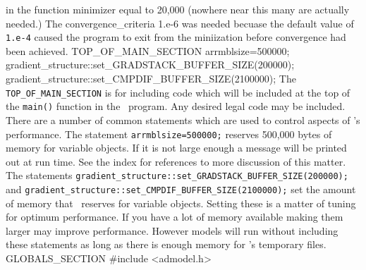 \documentclass[12pt]{book}
\begin{document}
in the function minimizer equal to 20,000 (nowhere near this many are actually
needed.) 
The   convergence\_criteria 1.e-6 
was needed becuase the default value of {\tt 1.e-4} caused the program to 
exit from the miniization before convergence had been achieved.
\beginexample
TOP_OF_MAIN_SECTION
  arrmblsize=500000;
  gradient_structure::set_GRADSTACK_BUFFER_SIZE(200000);
  gradient_structure::set_CMPDIF_BUFFER_SIZE(2100000);
\endexample
The  {\tt TOP\_OF\_MAIN\_SECTION} is for including code which
will be included at the top of the {\tt main()} function in the
\cplus\ program. Any desired legal code may be included. There are
a number of common statements which are used to control aspects
of \ADM's performance. 
The statement {\tt arrmblsize=500000;} reserves 500,000 bytes of memory
for variable objects. If it is not large enough a message will be printed
out at run time. See the index for references to more
discussion of this matter.
The statements {\tt gradient\_structure::set\_GRADSTACK\_BUFFER\_SIZE(200000);}
and {\tt gradient\_structure::set\_CMPDIF\_BUFFER\_SIZE(2100000);} 
set the amount of memory that \ADM\ reserves for variable objects.
Setting these is a matter of tuning for optimum performance. If you have 
a lot of memory available making them larger may improve performance.
However models will run without including these statements
as long as there is enough memory for \ADM's temporary files. 
\beginexample
GLOBALS_SECTION  
  #include <admodel.h>
  
\end{document}
